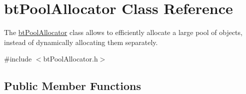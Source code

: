 \hypertarget{classbt_pool_allocator}{\section{bt\+Pool\+Allocator Class Reference}
\label{classbt_pool_allocator}
}


The \hyperlink{classbt_pool_allocator}{bt\+Pool\+Allocator} class allows to efficiently allocate a large pool of objects, instead of dynamically allocating them separately.  




{\ttfamily \#include $<$bt\+Pool\+Allocator.\+h$>$}

\subsection*{Public Member Functions}
